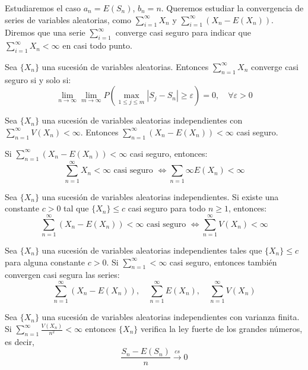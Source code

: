 \begin{remark}
    Estudiaremos el caso $a_n = E(S_n)$, $b_n = n$.
    Queremos estudiar la convergencia de series de variables aleatorias, como $\sum_{i=1}^\infty X_n$ y $\sum_{i=1}^\infty (X_n - E(X_n))$.
    Diremos que una serie $\sum_{i=1}^\infty$ converge casi seguro para indicar que $\sum_{i=1}^\infty X_n < \infty$ en casi todo punto.
\end{remark}

\begin{lemma}
    Sea $\{X_n\}$ una sucesión de variables aleatorias.
    Entonces $\sum_{n=1}^\infty X_n$ converge casi seguro si y solo si:
    $$\lim\limits_{n \to \infty} \lim\limits_{m \to \infty} P(\max_{1 \leq j \leq m} |S_j - S_n| \geq \varepsilon) = 0, \quad \forall \varepsilon > 0$$
\end{lemma}

\begin{theorem}
    Sea $\{X_n\}$ una sucesión de variables aleatorias independientes con $\sum_{n=1}^\infty V(X_n) < \infty$.
    Entonces $\sum_{n=1}^\infty (X_n - E(X_n)) < \infty$ casi seguro.
\end{theorem}

\begin{remark}
    Si $\sum_{n=1}^\infty (X_n - E(X_n)) < \infty$ casi seguro, entonces:
    $$\sum_{n=1}^\infty X_n < \infty \text{ casi seguro } \Leftrightarrow \sum_{n=1}\infty E(X_n) < \infty$$
\end{remark}

\begin{theorem}
    Sea $\{X_n\}$ una sucesión de variables aleatorias independientes.
    Si existe una constante $c > 0$ tal que $\{X_n\} \leq c$ casi seguro para todo $n \geq 1$, entonces:
    $$\sum_{n=1}^\infty (X_n - E(X_n)) < \infty \text{ casi seguro } \Leftrightarrow \sum_{n=1}^\infty V(X_n) < \infty$$
\end{theorem}

\begin{corollary}
    Sea $\{X_n\}$ una sucesión de variables aleatorias independientes tales que $\{X_n\} \leq c$ para alguna constante $c > 0$.
    Si $\sum_{n=1}^\infty < \infty$ casi seguro, entonces también convergen casi segura las series:
    $$\sum_{n=1}^\infty (X_n - E(X_n)), \quad \sum_{n=1}^\infty E(X_n), \quad \sum_{n=1}^\infty V(X_n)$$
\end{corollary}

\begin{theorem}
    Sea $\{X_n\}$ una sucesión de variables aleatorias independientes con varianza finita.
    Si $\sum_{n=1}^\infty \frac{V(X_n)}{n^2} < \infty$ entonces $\{X_n\}$ verifica la ley fuerte de los grandes números, es decir,
    $$\frac{S_n - E(S_n)}{n} \xrightarrow{cs} 0$$
\end{theorem}

